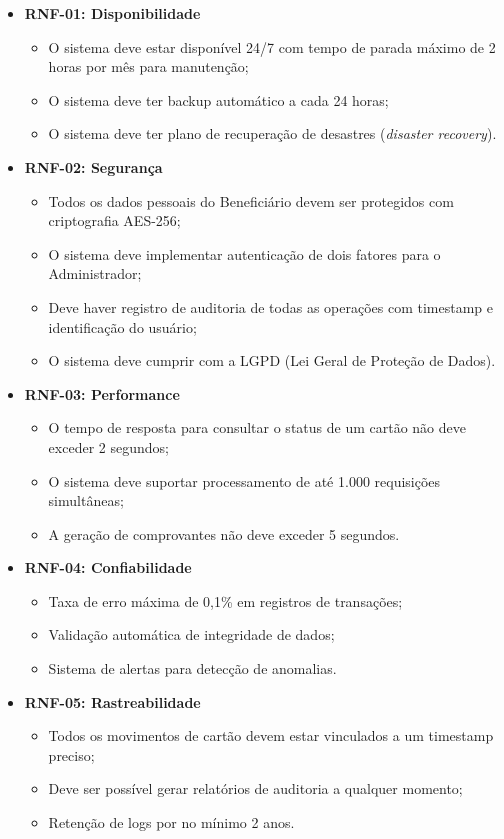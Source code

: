 \documentclass[
  article,
  a4paper,
  12pt,
  oneside,
  fleqn
]{abntex2}
\begin{document}
\begin{itemize}
    \item \textbf{RNF-01: Disponibilidade}
    \begin{itemize}
        \item O sistema deve estar disponível 24/7 com tempo de parada máximo de 2 horas por mês para manutenção;
        \item O sistema deve ter backup automático a cada 24 horas;
        \item O sistema deve ter plano de recuperação de desastres (\textit{disaster recovery}).
    \end{itemize}

    \item \textbf{RNF-02: Segurança}
    \begin{itemize}
        \item Todos os dados pessoais do Beneficiário devem ser protegidos com criptografia AES-256;
        \item O sistema deve implementar autenticação de dois fatores para o Administrador;
        \item Deve haver registro de auditoria de todas as operações com timestamp e identificação do usuário;
        \item O sistema deve cumprir com a LGPD (Lei Geral de Proteção de Dados).
    \end{itemize}

    \item \textbf{RNF-03: Performance}
    \begin{itemize}
        \item O tempo de resposta para consultar o status de um cartão não deve exceder 2 segundos;
        \item O sistema deve suportar processamento de até 1.000 requisições simultâneas;
        \item A geração de comprovantes não deve exceder 5 segundos.
    \end{itemize}

    \item \textbf{RNF-04: Confiabilidade}
    \begin{itemize}
        \item Taxa de erro máxima de 0,1\% em registros de transações;
        \item Validação automática de integridade de dados;
        \item Sistema de alertas para detecção de anomalias.
    \end{itemize}

    \item \textbf{RNF-05: Rastreabilidade}
    \begin{itemize}
        \item Todos os movimentos de cartão devem estar vinculados a um timestamp preciso;
        \item Deve ser possível gerar relatórios de auditoria a qualquer momento;
        \item Retenção de logs por no mínimo 2 anos.
    \end{itemize}
\end{itemize}
\end{document}
